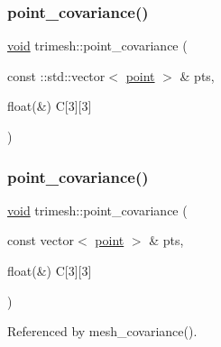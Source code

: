 \subsubsection{\texorpdfstring{point\+\_\+covariance()}{point\_covariance()}\hspace{0.1cm}{\footnotesize\ttfamily [1/2]}}
{\footnotesize\ttfamily \hyperlink{namespacetrimesh_a784ddfd979e1c579bda795a8edfc3f43}{void} trimesh\+::point\+\_\+covariance (\begin{DoxyParamCaption}\item[{const \+::std\+::vector$<$ \hyperlink{namespacetrimesh_a325b99fd6454b22fa4c4bc3223271b2c}{point} $>$ \&}]{pts,  }\item[{float(\&)}]{C\mbox{[}3\mbox{]}\mbox{[}3\mbox{]} }\end{DoxyParamCaption})}

\mbox{\label{namespacetrimesh_a86cb4656d1d912b5cf53f5d46ef96a0d}} 
\subsubsection{\texorpdfstring{point\+\_\+covariance()}{point\_covariance()}\hspace{0.1cm}{\footnotesize\ttfamily [2/2]}}
{\footnotesize\ttfamily \hyperlink{namespacetrimesh_a784ddfd979e1c579bda795a8edfc3f43}{void} trimesh\+::point\+\_\+covariance (\begin{DoxyParamCaption}\item[{const vector$<$ \hyperlink{namespacetrimesh_a325b99fd6454b22fa4c4bc3223271b2c}{point} $>$ \&}]{pts,  }\item[{float(\&)}]{C\mbox{[}3\mbox{]}\mbox{[}3\mbox{]} }\end{DoxyParamCaption})}



Referenced by mesh\+\_\+covariance().

\mbox{\label{namespacetrimesh_afa7eab0c3bb13bd1c31da85e46984a6a}} 
